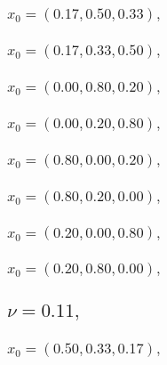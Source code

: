 \documentclass[a4paper]{article}
\begin{document}
\begin{multicols*}{2}
   \subsubsection{\(x_0 = (0.17,0.50,0.33),\quad \)}
   

   \subsubsection{\(x_0 = (0.17,0.33,0.50),\quad \)}
   

   \subsubsection{\(x_0 = (0.00,0.80,0.20),\quad \)}
   

   \subsubsection{\(x_0 = (0.00,0.20,0.80),\quad \)}
   

   \subsubsection{\(x_0 = (0.80,0.00,0.20),\quad \)}
   

   \subsubsection{\(x_0 = (0.80,0.20,0.00),\quad \)}
   

   \subsubsection{\(x_0 = (0.20,0.00,0.80),\quad \)}
   

   \subsubsection{\(x_0 = (0.20,0.80,0.00),\quad \)}
   

   \subsection{\(\nu = 0.11,\quad \)}
   

   \subsubsection{\(x_0 = (0.50,0.33,0.17),\quad \)}
   


\end{multicols*}
\end{document}
